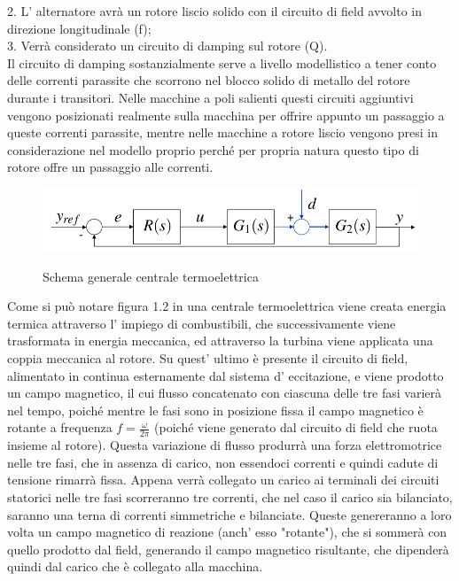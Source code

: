 \documentclass[Lau,noexaminfo]{sapthesis}
\begin{document}
	2. L' alternatore avrà un rotore liscio solido con il circuito di field avvolto in \\ \qquad direzione longitudinale (f);\\
	3. Verrà considerato un circuito di damping sul rotore (Q).\\
	Il circuito di damping sostanzialmente serve a livello modellistico a tener conto delle correnti parassite che scorrono nel blocco solido di metallo del rotore durante i transitori. Nelle macchine a poli salienti questi circuiti aggiuntivi vengono posizionati realmente sulla macchina per offrire appunto un passaggio a queste correnti parassite, mentre nelle macchine a rotore liscio vengono presi in considerazione nel modello proprio perché per propria natura questo tipo di rotore offre un passaggio alle correnti.
	\begin{figure}
		\centering
		\includegraphics[height=0.3\textheight]{schema_generale}\\
		\caption{Schema generale centrale termoelettrica}
	\end{figure}
	Come si può notare figura 1.2 in una centrale termoelettrica viene creata energia termica attraverso l' impiego di combustibili, che successivamente viene trasformata in energia meccanica, ed attraverso la turbina viene applicata una coppia meccanica al rotore. Su quest' ultimo è presente il circuito di field, alimentato in continua esternamente dal sistema d' eccitazione, e viene prodotto un campo magnetico, il cui flusso concatenato con ciascuna delle tre fasi varierà nel tempo, poiché mentre le fasi sono in posizione fissa il campo magnetico è rotante a frequenza $f=\frac{\omega}{2\pi}$ (poiché viene generato dal circuito di field che ruota insieme al rotore). Questa variazione di flusso produrrà una forza elettromotrice nelle tre fasi, che in assenza di carico, non essendoci correnti e quindi cadute di tensione rimarrà fissa. Appena verrà collegato un carico ai terminali dei circuiti statorici nelle tre fasi scorreranno tre correnti, che nel caso il carico sia bilanciato, saranno una terna di correnti simmetriche e bilanciate. Queste genereranno a loro volta un campo magnetico di reazione (anch' esso "rotante"), che si sommerà con quello prodotto dal field, generando il campo magnetico risultante, che dipenderà quindi dal carico che è collegato alla macchina.
\end{document}

